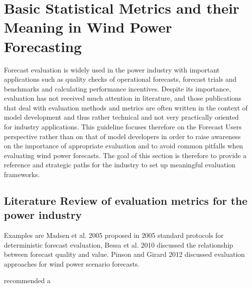 \chapter{Basic Statistical Metrics and their Meaning in Wind Power Forecasting}\label{ch:metrics}

Forecast evaluation is widely used in the power industry with important applications such as quality checks of operational forecasts, forecast trials and benchmarks and calculating performance incentives.
Despite its importance, evaluation has not received much attention in literature, and those publications that deal with evaluation methods and metrics are often written in the context of model development and thus rather technical and not very practically oriented for industry applications.
This guideline focuses therefore on the Forecast Users perspective rather than on that of model developers in order to raise awareness on the importance of appropriate evaluation and to avoid common pitfalls when evaluating wind power forecasts. The goal of this section is therefore to provide a reference and strategic paths for the industry to set up meaningful evaluation frameworks.

\section{Literature Review of evaluation metrics for the power industry}\label{sec:LiteratureReview}

Examples are Madsen et al. 2005 proposed in 2005 standard protocols for deterministic forecast evaluation, Bessa et al. 2010 discussed the relationship between forecast quality and value. 
Pinson and Girard 2012 discussed evaluation approaches for wind power scenario forecasts.

\cite{lerch}
\cite{murphy}
\cite{wilks}
\cite{zhang}

\cite{madsen2005} recommended a 

